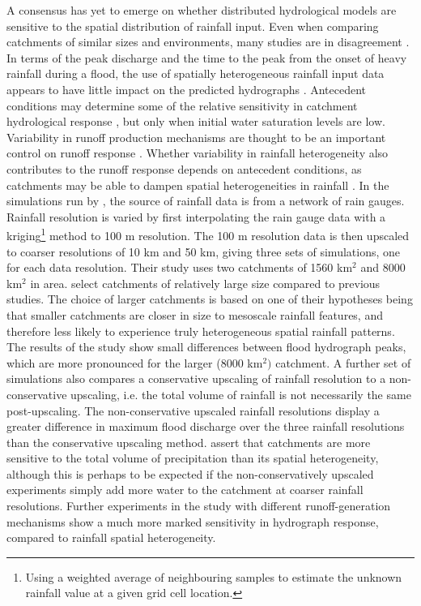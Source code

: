 A consensus has yet to emerge on whether distributed hydrological models are sensitive to the spatial distribution of rainfall input. Even when comparing catchments of similar sizes and environments, many studies are in disagreement \citep{nicotina2008impact}. In terms of the peak discharge and the time to the peak from the onset of heavy rainfall during a flood, the use of spatially heterogeneous rainfall input data appears to have little impact on the predicted hydrographs \citep{krajewski1991monte,shah1996amodelling,shah1996bmodelling}. Antecedent conditions may determine some of the relative sensitivity in catchment hydrological response \citep{shah1996bmodelling}, but only when initial water saturation levels are low. Variability in runoff production mechanisms are thought to be an important control on runoff response \citep{shah1996bmodelling,segond2007simulation}. Whether variability in rainfall heterogeneity also contributes to the runoff response depends on antecedent conditions, as catchments may be able to dampen spatial heterogeneities in rainfall \citep{segond2007simulation}. In the simulations run by \citet{nicotina2008impact}, the source of rainfall data is from a network of rain gauges. Rainfall resolution is varied by first interpolating the rain gauge data with a kriging\footnote{Using a weighted average of neighbouring samples to estimate the unknown rainfall value at a given grid cell location.} method to 100 m resolution. The 100 m resolution data is then upscaled to coarser resolutions of 10 km and 50 km, giving three sets of simulations, one for each data resolution. Their study uses two catchments of 1560 km\(^2\) and 8000 km\(^2\) in area. \citet{nicotina2008impact} select catchments of relatively large size compared to previous studies. The choice of larger catchments is based on one of their hypotheses being that smaller catchments are closer in size to mesoscale rainfall features, and therefore less likely to experience truly heterogeneous spatial rainfall patterns. The results of the \citet{nicotina2008impact} study show small differences between flood hydrograph peaks, which are more pronounced for the larger (8000 km\(^2)\) catchment. A further set of simulations also compares a conservative upscaling of rainfall resolution to a non-conservative upscaling, i.e. the total volume of rainfall is not necessarily the same post-upscaling. The non-conservative upscaled rainfall resolutions display a greater difference in maximum flood discharge over the three rainfall resolutions than the conservative upscaling method. \citet{nicotina2008impact} assert that catchments are more sensitive to the total volume of precipitation than its spatial heterogeneity, although this is perhaps to be expected if the non-conservatively upscaled experiments simply add more water to the catchment at coarser rainfall resolutions.  Further experiments in the \citet{nicotina2008impact} study with different runoff-generation mechanisms show a much more marked sensitivity in hydrograph response, compared to rainfall spatial heterogeneity. 

